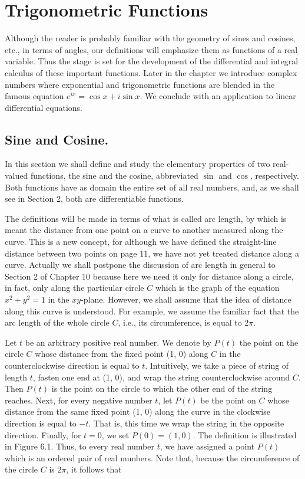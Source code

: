 \chapter{Trigonometric Functions}\label{chp 6}
 
Although the reader is probably familiar with the geometry of sines and cosines, etc., in terms of angles, our definitions will emphasize them as functions of a real variable. Thus the stage is set for the development of the differential and integral calculus of these important functions.  Later in the chapter we introduce complex numbers where exponential and trigonometric functions are blended in the famous equation $e^{ix} = \cos x + i \sin x$. We conclude with an application to linear differential equations.

\section{Sine and Cosine.}
In this section we shall define and study the elementary properties of two real-valued functions, the sine and the cosine, abbreviated $\sin$ and $\cos$, respectively. Both functions have as domain the entire set of all real numbers, and, as we shall see in Section 2, both are differentiable functions.

The definitions will be made in terms of what is called arc length, by which is meant the distance from one point on a curve to another measured along the curve. This is a new concept, for although we have defined the straight-line distance between two points on page 11, we have not yet treated distance along a curve. Actually we shall postpone the discussion of arc length in general to Section 2 of Chapter 10 because here we need it only for distance along a circle, in fact, only along the particular circle $C$ which is the graph of the equation $x^2 + y^2 = 1$ in the $xy$-plane. However, we shall assume that the idea of distance along this curve is understood. For example, we assume the familiar fact that the arc length of the whole circle $C$, i.e., its circumference, is equal to $2\pi$.

Let $t$ be an arbitrary positive real number. We denote by $P(t)$ the point on the
circle $C$ whose distance from the fixed point (1, 0) along $C$ in the counterclockwise direction is equal to $t$. Intuitively, we take a piece of string of length $t$, fasten one end at (1, 0), and wrap the string counterclockwise around $C$. Then $P(t)$ is the point on the circle to which the other end of the string reaches. Next, for every negative number $t$, let $P(t)$ be the point on $C$ whose distance from the same fixed point (1, 0) along the curve in the clockwise direction is equal to $-t$. That is, this time we wrap the string in the opposite direction. Finally, for $t = 0$, we set $P(0) = (1,0)$. The definition
is illustrated in Figure \f{6.1}. Thus, to every real number $t$, we have assigned a point $P(t)$ which is an ordered pair of real numbers. Note that, because the circumference of the circle $C$ is $2\pi$, it follows that

